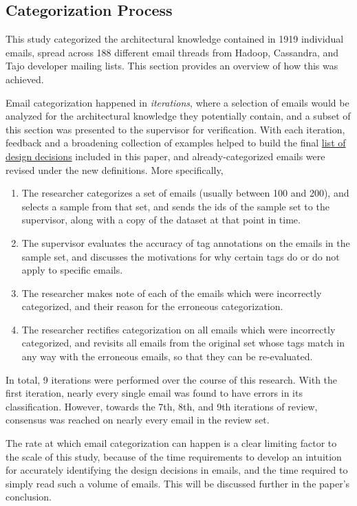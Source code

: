 \documentclass[a4paper, 12pt]{article}
\begin{document}
	\subsection{Categorization Process}
		This study categorized the architectural knowledge contained in 1919 individual emails, spread across 188 different email threads from Hadoop, Cassandra, and Tajo developer mailing lists. This section provides an overview of how this was achieved.
		
		Email categorization happened in \textit{iterations}, where a selection of emails would be analyzed for the architectural knowledge they potentially contain, and a subset of this section was presented to the supervisor for verification. With each iteration, feedback and a broadening collection of examples helped to build the final \hyperref[sec:design-decisions]{list of design decisions} included in this paper, and already-categorized emails were revised under the new definitions. More specifically,
		
		\begin{enumerate}
			\item The researcher categorizes a set of emails (usually between 100 and 200), and selects a sample from that set, and sends the ids of the sample set to the supervisor, along with a copy of the dataset at that point in time.
			\item The supervisor evaluates the accuracy of tag annotations on the emails in the sample set, and discusses the motivations for why certain tags do or do not apply to specific emails.
			\item The researcher makes note of each of the emails which were incorrectly categorized, and their reason for the erroneous categorization.
			\item The researcher rectifies categorization on all emails which were incorrectly categorized, and revisits all emails from the original set whose tags match in any way with the erroneous emails, so that they can be re-evaluated.
		\end{enumerate}
		
		In total, 9 iterations were performed over the course of this research. With the first iteration, nearly every single email was found to have errors in its classification. However, towards the 7th, 8th, and 9th iterations of review, consensus was reached on nearly every email in the review set.
	
		The rate at which email categorization can happen is a clear limiting factor to the scale of this study, because of the time requirements to develop an intuition for accurately identifying the design decisions in emails, and the time required to simply read such a volume of emails. This will be discussed further in the paper's conclusion.
		
\end{document}
